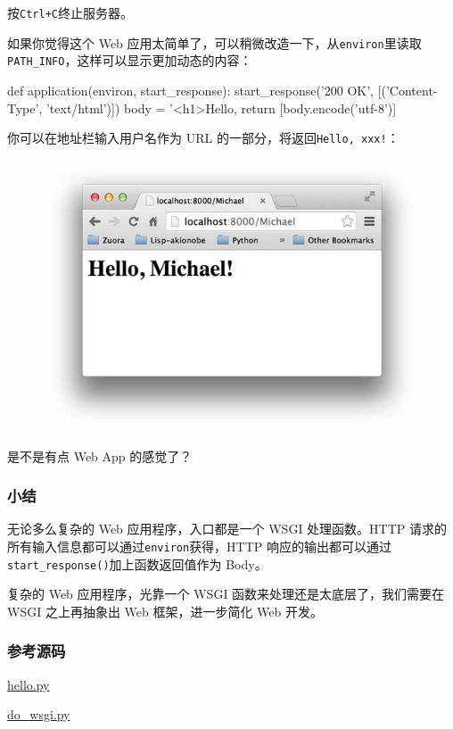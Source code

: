 按\texttt{Ctrl+C}终止服务器。

如果你觉得这个 Web
应用太简单了，可以稍微改造一下，从\texttt{environ}里读取\texttt{PATH\_INFO}，这样可以显示更加动态的内容：

\begin{pythoncode}
def application(environ, start_response):
    start_response('200 OK', [('Content-Type', 'text/html')])
    body = '<h1>Hello, %
    return [body.encode('utf-8')]
\end{pythoncode}

你可以在地址栏输入用户名作为 URL 的一部分，将返回\texttt{Hello,\ xxx!}：

 
 \begin{figure}[htp]
	\centering
	\includegraphics[width=0.6\linewidth]{fig/950751959286720.png}
\end{figure}


是不是有点 Web App 的感觉了？

\hypertarget{ux5c0fux7ed3}{%
\subsubsection{小结}\label{ux5c0fux7ed3}}

无论多么复杂的 Web 应用程序，入口都是一个 WSGI 处理函数。HTTP
请求的所有输入信息都可以通过\texttt{environ}获得，HTTP
响应的输出都可以通过\texttt{start\_response()}加上函数返回值作为 Body。

复杂的 Web 应用程序，光靠一个 WSGI 函数来处理还是太底层了，我们需要在
WSGI 之上再抽象出 Web 框架，进一步简化 Web 开发。

\hypertarget{ux53c2ux8003ux6e90ux7801}{%
\subsubsection{参考源码}\label{ux53c2ux8003ux6e90ux7801}}

\href{https://github.com/michaelliao/learn-python3/blob/master/samples/web/hello.py}{hello.py}

\href{https://github.com/michaelliao/learn-python3/blob/master/samples/web/do_wsgi.py}{do\_wsgi.py}

